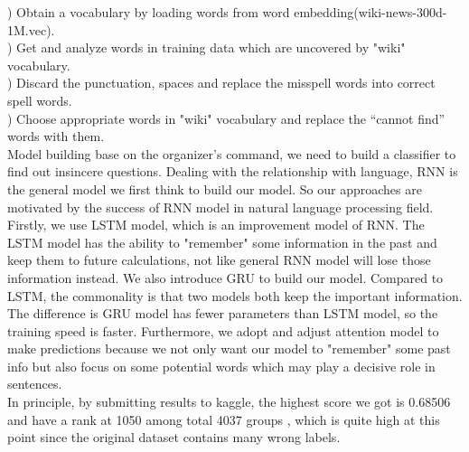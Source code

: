 \documentclass{article}
\begin{document}
) Obtain a vocabulary by loading words from word embedding(wiki-news-300d-1M.vec). \\
) Get and analyze words in training data which are uncovered by "wiki" vocabulary.\\
) Discard the punctuation, spaces and replace the misspell words into correct spell words.\\
) Choose appropriate words in "wiki" vocabulary and replace the “cannot find” words with them.\\


\noindent Model building base on the organizer's command, we need to build a classifier to find out insincere questions. Dealing with the relationship with language, RNN is the general model we first think  to build our model. So our approaches are motivated by the success of RNN model in natural language processing field. Firstly, we  use LSTM model, which is an improvement model of RNN. The LSTM model has the ability to "remember" some information in the past and keep them to future calculations, not like general RNN model will lose those information instead. We also introduce GRU to build our model. Compared to LSTM, the commonality is that two models both keep the important information. The difference is GRU model has fewer parameters than LSTM model, so the training speed is faster. Furthermore, we adopt and adjust attention model to make predictions because we not only want our model to "remember" some past info but also focus on some potential words which may play a decisive role in sentences.\\

\noindent In principle, by submitting results to kaggle, the highest score we got is 0.68506 and have a rank at 1050 among total 4037 groups , which is quite high at this point since the original dataset contains many wrong labels. \\
\end{document}
